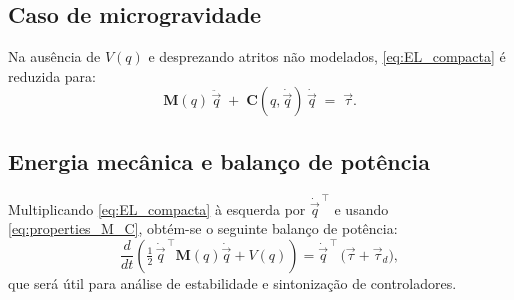 \subsection{Caso de microgravidade}
Na ausência de $V(q)$ e desprezando atritos não modelados, \eqref{eq:EL_compacta} é reduzida para:
\begin{equation}
\mathbf M(q)\,\ddot{\vec q} \;+\; \mathbf C(q,\dot{\vec q})\,\dot{\vec q}
\;=\; \vec \tau.
\label{eq:EL_microgravidade}
\end{equation}

\subsection{Energia mecânica e balanço de potência}
Multiplicando \eqref{eq:EL_compacta} à esquerda por $\dot{\vec q}^{\,\top}$ e usando \eqref{eq:properties_M_C}, obtém-se o seguinte balanço de potência:
\begin{equation}
\frac{d}{dt}\!\left(\tfrac12\,\dot{\vec q}^{\,\top}\mathbf M(q)\dot{\vec q} + V(q)\right)=
\dot{\vec q}^{\,\top}\,\big(\vec \tau + \vec \tau_{\!d}\big),
\label{eq:energy_balance}
\end{equation}
que será útil para análise de estabilidade e sintonização de controladores.
